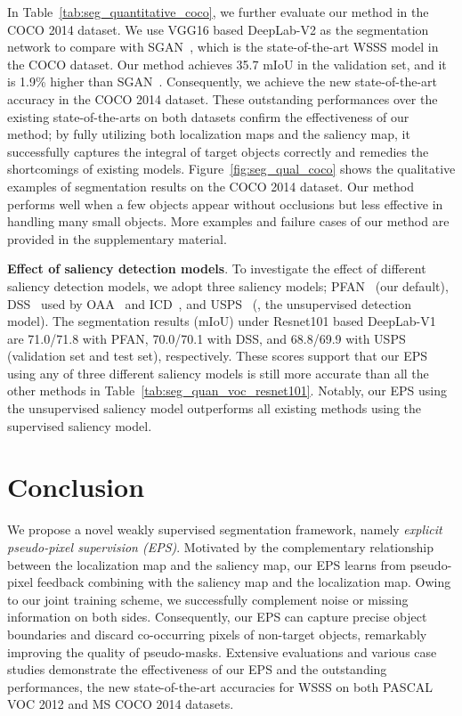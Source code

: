\documentclass[final]{cvpr}
\begin{document}
In Table~\ref{tab:seg_quantitative_coco}, we further evaluate our method in the COCO 2014 dataset. We use VGG16 based DeepLab-V2 as the segmentation network to compare with SGAN~\cite{yao2020saliency}, which is the state-of-the-art WSSS model in the COCO dataset. Our method achieves 35.7 mIoU in the validation set, and it is 1.9\% higher than SGAN~\cite{yao2020saliency}. Consequently, we achieve the new state-of-the-art accuracy in the COCO 2014 dataset. These outstanding performances over the existing state-of-the-arts on both datasets confirm the effectiveness of our method; by fully utilizing both localization maps and the saliency map, it successfully captures the integral of target objects correctly and remedies the shortcomings of existing models. Figure~\ref{fig:seg_qual_coco} shows the qualitative examples of segmentation results on the COCO 2014 dataset. Our method performs well when a few objects appear without occlusions but less effective in handling many small objects. More examples and failure cases of our method are provided in the supplementary material.

\vspace{1mm}
\noindent \textbf{Effect of saliency detection models}. To investigate the effect of different saliency detection models, we adopt three saliency models; PFAN~\cite{zhao2019pyramid} (our default), DSS~\cite{hou2017deeply} used by OAA~\cite{jiang2019integral} and ICD~\cite{fan2020learning}, and USPS~\cite{nguyen2019deepusps} (\ie, the unsupervised detection model). The segmentation results (mIoU) under Resnet101 based DeepLab-V1 are 71.0/71.8 with PFAN, 70.0/70.1 with DSS, and 68.8/69.9 with USPS (validation set and test set), respectively. These scores support that our EPS using any of three different saliency models is still more accurate than all the other methods in Table~\ref{tab:seg_quan_voc_resnet101}. Notably, our EPS using the unsupervised saliency model outperforms all existing methods using the supervised saliency model. 


\section{Conclusion}
We propose a novel weakly supervised segmentation framework, namely \emph{explicit pseudo-pixel supervision (EPS)}. Motivated by the complementary relationship between the localization map and the saliency map, our EPS learns from pseudo-pixel feedback combining with the saliency map and the localization map. Owing to our joint training scheme, we successfully complement noise or missing information on both sides. Consequently, our EPS can capture precise object boundaries and discard co-occurring pixels of non-target objects, remarkably improving the quality of pseudo-masks. Extensive evaluations and various case studies demonstrate the effectiveness of our EPS and the outstanding performances, the new state-of-the-art accuracies for WSSS on both PASCAL VOC 2012 and MS COCO 2014 datasets.
\end{document}
